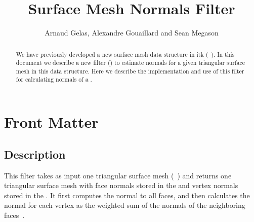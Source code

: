 \documentclass{InsightArticle}
\title{Surface Mesh Normals Filter}
\author{Arnaud Gelas, Alexandre Gouaillard and Sean Megason}
\theoremstyle{plain}
\begin{document}
\ifpdf
\else
\fi


\maketitle


\ifhtml
\chapter*{Front Matter\label{front}}
\fi


\begin{abstract}
\noindent
We have previously developed a new surface mesh data structure in itk (~\cite{itkQE}). In this document we describe a new filter () to estimate normals for a given triangular surface mesh in this data structure. Here we describe the implementation and use of this filter for calculating normals of a .
\end{abstract}

\tableofcontents

\section{Description}
This filter takes as input one triangular surface mesh (~\cite{itkQE}) and returns one triangular surface mesh with face normals stored in the  and vertex normals stored in the . It first computes the normal to all faces, and then calculates the normal for each vertex as the weighted sum of the normals of the neighboring faces~\cite{Jin05}.
\end{document}
